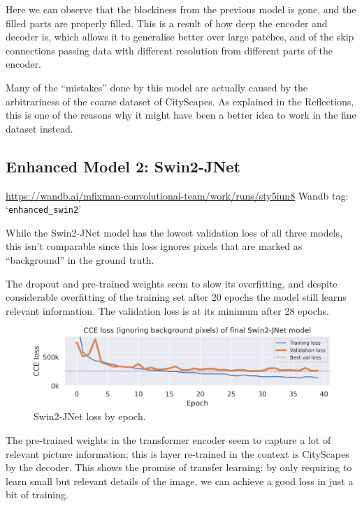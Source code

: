 Here we can observe that the blockiness from the previous model is gone, and the filled parts are properly filled.
This is a result of how deep the encoder and decoder is, which allows it to generalise better over large patches, and of the skip connections passing data with different resolution from different parts of the encoder.

Many of the ``mistakes'' done by this model are actually caused by the arbitrariness of the coarse dataset of CityScapes.
As explained in the Reflections, this is one of the reasons why it might have been a better idea to work in the fine dataset instead.

\newpage{}

\subsection{Enhanced Model 2: Swin2-JNet}
\begin{scriptsize}
	\vspace{-\parskip}
	\url{https://wandb.ai/mfixman-convolutional-team/work/runs/sty5iun8}
	\hfill{} Wandb tag: `\texttt{enhanced\_swin2}'
\end{scriptsize}

While the Swin2-JNet model has the lowest validation loss of all three models, this isn't comparable since this loss ignores pixels that are marked as ``background'' in the ground truth.

The dropout and pre-trained weights seem to slow its overfitting, and despite considerable overfitting of the training set after 20 epochs the model still learns relevant information.
The validation loss is at its minimum after 28 epochs.

\begin{figure}[h]
	\centering
	\includegraphics[width=.9\textwidth]{swin2_loss.png}
	\caption{Swin2-JNet loss by epoch.}
	\label{swin2_model_loss}
\end{figure}

The pre-trained weights in the transformer encoder seem to capture a lot of relevant picture information; this is layer re-trained in the context is CityScapes by the decoder.
This shows the promise of transfer learning: by only requiring to learn small but relevant details of the image, we can achieve a good loss in just a bit of training.

